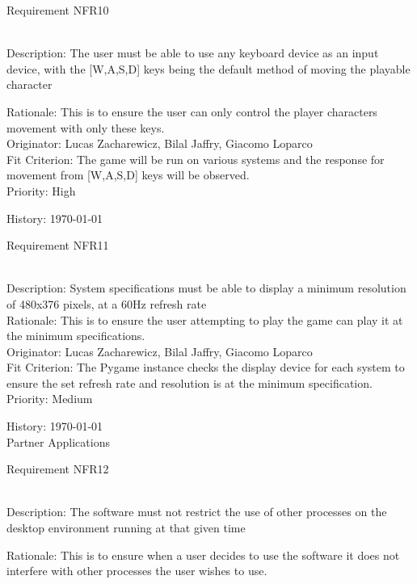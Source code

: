 \documentclass[12pt, titlepage]{article}
\begin{document}
\begin{enumerate}
{\color{blue}\item Requirement NFR10}\\
{\color{blue} Description:} The user must be able to use any keyboard device as an input device, with the [W,A,S,D] keys being the default method of moving the playable character

{\color{blue}Rationale: This is to ensure the user can only control the player characters movement with only these keys.}\\

{\color{blue}Originator:  Lucas Zacharewicz, Bilal Jaffry, Giacomo Loparco}\\

{\color{blue}Fit Criterion: The game will be run on various systems and the response for movement from [W,A,S,D] keys will be observed.}\\
 
{\color{blue}Priority: High}
  
{\color{blue}History: \today}

{\color{blue}\item Requirement NFR11}\\
{\color{blue} Description:} System specifications must be able to display a minimum resolution of 480x376 pixels, at a 60Hz refresh rate\\
{\color{blue}Rationale: This is to ensure the user attempting to play the game can play it at the minimum specifications.}\\

{\color{blue}Originator:  Lucas Zacharewicz, Bilal Jaffry, Giacomo Loparco}\\

{\color{blue}Fit Criterion: The Pygame instance checks the display device for each system to ensure the set refresh rate and resolution is at the minimum specification.}\\
 
{\color{blue}Priority: Medium}
  
{\color{blue}History: \today}\\

Partner Applications

{\color{blue}\item Requirement NFR12}\\
{\color{blue} Description:} The software must not restrict the use of other processes on the desktop environment running at that given time

{\color{blue}Rationale: This is to ensure when a user decides to use the software it does not interfere with other processes the user wishes to use.}\\


\end{enumerate}
\end{document}
